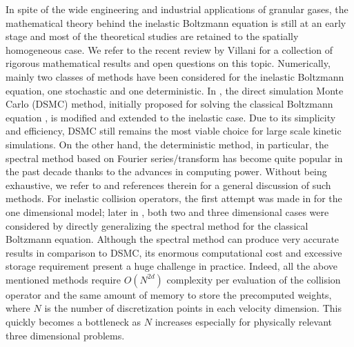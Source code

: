 \documentclass[review, times]{elsarticle}
\begin{document}
In spite of the wide engineering and industrial applications of granular gases, the mathematical theory behind the inelastic Boltzmann equation is still at an early stage and most of the theoretical studies are retained to the spatially homogeneous case. We refer to the recent review by Villani \cite{Villani2006} for a collection of rigorous mathematical results and open questions on this topic. Numerically, mainly two classes of methods have been considered for the inelastic Boltzmann equation, one stochastic and one deterministic. In \cite{MS00, GRW05, RW07}, the direct simulation Monte Carlo (DSMC) method, initially proposed for solving the classical Boltzmann equation \cite{Bird}, is modified and extended to the inelastic case. Due to its simplicity and efficiency, DSMC still remains the most viable choice for large scale kinetic simulations. On the other hand, the deterministic method, in particular, the spectral method based on Fourier series/transform has become quite popular in the past decade thanks to the advances in computing power. Without being exhaustive, we refer to \cite{DP14} and references therein for a general discussion of such methods. For inelastic collision operators, the first attempt was made in \cite{NPT03} for the one dimensional model; later in \cite{FPT05, GT09, FR13}, both two and three dimensional cases were considered by directly generalizing the spectral method for the classical Boltzmann equation. Although the spectral method can produce very accurate results in comparison to DSMC, its enormous computational cost and excessive storage requirement present a huge challenge in practice. Indeed, all the above mentioned methods require $O(N^{2d})$ complexity per evaluation of the collision operator and the same amount of memory to store the precomputed weights, where $N$ is the number of discretization points in each velocity dimension. This quickly becomes a bottleneck as $N$ increases especially for physically relevant three dimensional problems.
\end{document}
